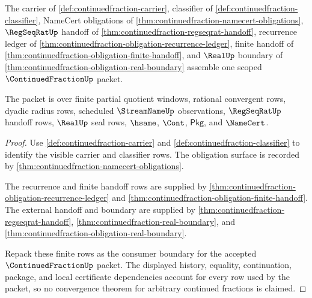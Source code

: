 \begin{theorem}
\label{thm:continuedfraction-scoped-boundary}
The carrier of \autoref{def:continuedfraction-carrier}, classifier of
\autoref{def:continuedfraction-classifier}, NameCert obligations of
\autoref{thm:continuedfraction-namecert-obligations}, $\RegSeqRatUp$ handoff of
\autoref{thm:continuedfraction-regseqrat-handoff}, recurrence ledger of
\autoref{thm:continuedfraction-obligation-recurrence-ledger}, finite handoff of
\autoref{thm:continuedfraction-obligation-finite-handoff}, and $\RealUp$
boundary of \autoref{thm:continuedfraction-obligation-real-boundary} assemble
one scoped $\ContinuedFractionUp$ packet.

The packet is over finite partial quotient windows, rational convergent rows,
dyadic radius rows, scheduled $\StreamNameUp$ observations, $\RegSeqRatUp$
handoff rows, $\RealUp$ seal rows, $\hsame$, $\Cont$, $\mathsf{Pkg}$, and
$\NameCert$.
\end{theorem}
\begin{proof}
Use \autoref{def:continuedfraction-carrier} and
\autoref{def:continuedfraction-classifier} to identify the visible carrier and
classifier rows. The obligation surface is recorded by
\autoref{thm:continuedfraction-namecert-obligations}.

The recurrence and finite handoff rows are supplied by
\autoref{thm:continuedfraction-obligation-recurrence-ledger} and
\autoref{thm:continuedfraction-obligation-finite-handoff}. The external
handoff and boundary are supplied by
\autoref{thm:continuedfraction-regseqrat-handoff},
\autoref{thm:continuedfraction-real-boundary}, and
\autoref{thm:continuedfraction-obligation-real-boundary}.

Repack these finite rows as the consumer boundary for the accepted
$\ContinuedFractionUp$ packet. The displayed history, equality, continuation,
package, and local certificate dependencies account for every row used by the
packet, so no convergence theorem for arbitrary continued fractions is claimed.
\end{proof}

